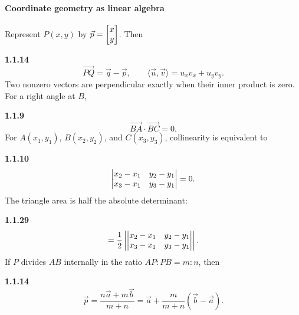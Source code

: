 \paragraph*{Coordinate geometry as linear algebra}
Represent $P(x,y)$ by $\vec p=\myvec{x\\y}$. Then
\setcounter{qcurrent}{14}\setcounter{equation}{0}
\par\noindent\textbf{1.1.14}\quad
\begin{equation}
\overrightarrow{PQ}=\vec q-\vec p,\qquad
\langle\vec u,\vec v\rangle=u_xv_x+u_yv_y.
\label{eq:vector-basics}
\end{equation}
Two nonzero vectors are perpendicular exactly when their inner product is zero.
For a right angle at $B$,
\par\noindent\textbf{1.1.9}\quad
\begin{equation}
\overrightarrow{BA}\cdot\overrightarrow{BC}=0.\tag{1.1.9.1}\label{eq:right-angle-dot}
\end{equation}
For $A(x_1,y_1)$, $B(x_2,y_2)$, and $C(x_3,y_3)$, collinearity is equivalent to
\setcounter{qcurrent}{10}\setcounter{equation}{0}
\par\noindent\textbf{1.1.10}\quad
\begin{equation}
\begin{vmatrix}x_2-x_1&y_2-y_1\\x_3-x_1&y_3-y_1\end{vmatrix}=0.
\label{eq:collinear-det}
\end{equation}
The triangle area is half the absolute determinant:
\setcounter{qcurrent}{29}\setcounter{equation}{0}
\par\noindent\textbf{1.1.29}\quad
\begin{equation}
[ABC]=\frac12\left|\mydet{x_2-x_1&y_2-y_1\\x_3-x_1&y_3-y_1}\right|.
\label{eq:triangle-det}
\end{equation}
If $P$ divides $AB$ internally in the ratio $AP:PB=m:n$, then
\setcounter{qcurrent}{14}\setcounter{equation}{0}
\setcounter{qcurrent}{14}\setcounter{equation}{1}
\par\noindent\textbf{1.1.14}\quad
\begin{equation}
\vec p=\frac{n\vec a+m\vec b}{m+n}=\vec a+\frac{m}{m+n}(\vec b-\vec a).
\label{eq:section-vector}
\end{equation}
